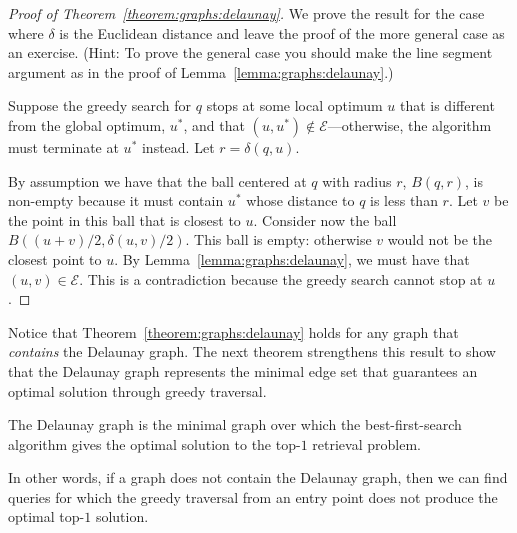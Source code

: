 \begin{proof}[Proof of Theorem~\ref{theorem:graphs:delaunay}]
    We prove the result for the case where $\delta$ is the Euclidean
    distance and leave the proof of the more general case as an exercise.
    (Hint: To prove the general case you should make the line segment
    argument as in the proof of Lemma~\ref{lemma:graphs:delaunay}.)

    Suppose the greedy search for $q$ stops at some local optimum $u$
    that is different from the global optimum, $u^\ast$,
    and that $(u, u^\ast) \notin \mathcal{E}$---otherwise,
    the algorithm must terminate at $u^\ast$ instead.
    Let $r = \delta(q, u)$.
    
    By assumption we have that the ball centered at $q$ with radius $r$,
    $B(q, r)$, is non-empty because it must contain $u^\ast$ whose distance to $q$ is less than $r$.
    Let $v$ be the point in this ball that is closest to $u$.
    Consider now the ball $B((u + v)/2, \delta(u, v)/2)$.
    This ball is empty: otherwise $v$ would not be the closest point to $u$.
    By Lemma~\ref{lemma:graphs:delaunay}, we must have that $(u, v) \in \mathcal{E}$.
    This is a contradiction because the greedy search cannot stop at $u$.
\end{proof}

\begin{svgraybox}
Notice that Theorem~\ref{theorem:graphs:delaunay} holds for any graph
that \emph{contains} the Delaunay graph.
The next theorem strengthens this result to show that the Delaunay graph represents
the minimal edge set that guarantees an optimal solution through greedy traversal.
\end{svgraybox}

\begin{theorem}
    \label{theorem:graphs:delaunay-is-minimal}
    The Delaunay graph is the minimal graph over which the best-first-search algorithm
    gives the optimal solution to the top-$1$ retrieval problem.
\end{theorem}

In other words, if a graph does not contain the Delaunay graph, then we can find queries
for which the greedy traversal from an entry point does not produce the optimal top-$1$
solution.

